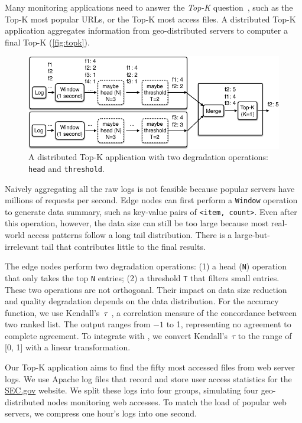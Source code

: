  Many monitoring applications need to answer the
\textit{Top-K} question~\cite{babcock2003distributed}, such as the Top-K most
popular URLs, or the Top-K most access files. A distributed Top-K application
aggregates information from geo-distributed servers to computer a final Top-K
(\autoref{fig:topk}).

\begin{figure}
  \centering
  \includegraphics[width=\columnwidth]{figures/topk.pdf}
  \caption{A distributed Top-K application with two degradation operations:
    \texttt{head} and \texttt{threshold}.}
  \label{fig:topk}
\end{figure}

Naively aggregating all the raw logs is not feasible because popular servers
have millions of requests per second. Edge nodes can first perform a
\texttt{Window} operation to generate data summary, such as key-value pairs of
\texttt{<item, count>}. Even after this operation, however, the data size can
still be too large because most real-world access patterns follow a long tail
distribution. There is a large-but-irrelevant tail that contributes little to
the final results.

The edge nodes perform two degradation operations: (1) a head (\texttt{N})
operation that only takes the top \texttt{N} entries; (2) a threshold \texttt{T}
that filters small entries. These two operations are not orthogonal. Their impact on data size reduction and quality degradation depends on
the data distribution. For the accuracy function, we use Kendall's~$\tau$~\cite{abdi2007kendall}, a correlation measure of the
concordance between two ranked list. The output ranges from \(-1\) to 1,
representing no agreement to complete agreement. To integrate with \sysname{},
we convert Kendall's~$\tau$ to the range of [0, 1] with a linear transformation.

Our Top-K application aims to find the fifty most accessed files from web server
logs. We use Apache log files that record and store user access statistics for
the \href{https://www.sec.gov}{SEC.gov} website. We split these logs into four
groups, simulating four geo-distributed nodes monitoring web accesses.
To match the load of popular web servers, we compress one hour's logs into one second.

